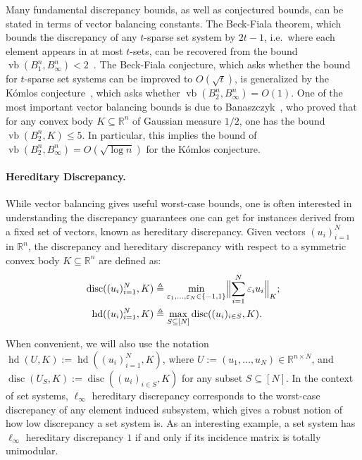 \documentclass[11pt]{article}
\newcommand{\R}{{\mathbb{R}}}
\newcommand\eps{\varepsilon}
\newcommand{\eqdef}{\triangleq}
\DeclareMathOperator{\disc}{disc}
\DeclareMathOperator{\hd}{hd}
\DeclareMathOperator{\vb}{vb}
\begin{document}
Many fundamental discrepancy bounds, as well as conjectured bounds, can be
stated in terms of vector balancing constants. The Beck-Fiala theorem, which
bounds the discrepancy of any $t$-sparse set system by $2t-1$, i.e.~where each
element appears in at most $t$-sets, can be recovered from the bound
$\vb(B_1^n,B_\infty^n) < 2$~\cite{beckfiala}. The Beck-Fiala conjecture,
which asks whether the bound for $t$-sparse set systems can be improved to
$O(\sqrt{t})$, is generalized by the K{\'o}mlos conjecture~\cite{spencer-lectures},
which asks whether $\vb(B_2^n,B_\infty^n) = O(1)$. One of the most important
vector balancing bounds is due to Banaszczyk~\cite{bana}, who proved that for
any convex body $K \subseteq \R^n$ of Gaussian measure $1/2$, one has the bound
$\vb(B_2^n,K) \leq 5$. In particular, this implies the bound of
$\vb(B_2^n,B_\infty^n) = O(\sqrt{\log n})$ for the K{\'o}mlos conjecture. 

\paragraph{\bf Hereditary Discrepancy.} While vector balancing gives useful
worst-case bounds, one is often interested in understanding the discrepancy
guarantees one can get for instances derived from a fixed set of vectors, known
as hereditary discrepancy. Given vectors $(u_i)_{i=1}^N$ in $\R^n$, the
discrepancy and hereditary discrepancy with respect to a symmetric convex body
$K \subseteq \R^n$ are defined as:
\begin{align*}
\disc((u_i)_{i = 1}^N,K) &\eqdef \min_{\eps_1, \ldots,\eps_N \in
  \{-1, 1\}}
\Bigl\|\sum_{i = 1}^N{\eps_i u_i}\Bigr\|_{K};\\
\hd((u_i)_{i = 1}^N, K) &\eqdef \max_{S \subseteq [N]}{\disc((u_i)_{i \in S}, K)}.
\end{align*}

When convenient, we will also use the notation $\hd(U,K) :=
\hd((u_i)_{i=1}^N,K)$, where $U := (u_1,\dots,u_N) \in \R^{n \times N}$, and
$\disc(U_S,K) := \disc((u_i)_{i \in S},K)$ for any subset $S \subseteq [N]$.  In
the context of set systems, $\ell_\infty$ hereditary discrepancy corresponds to
the worst-case discrepancy of any element induced subsystem, which gives a
robust notion of how low discrepancy a set system is. As an interesting example,
a set system has $\ell_\infty$ hereditary discrepancy $1$ if and only if its
incidence matrix is totally unimodular. 
\end{document}
